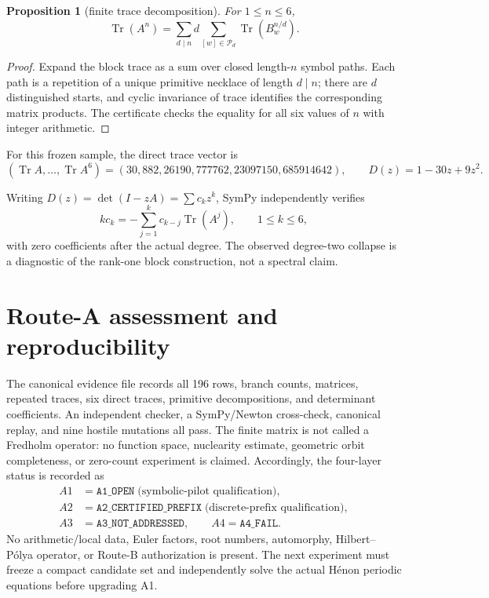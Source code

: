 \documentclass[10pt]{article}
\newtheorem{proposition}{Proposition}
\begin{document}
\begin{proposition}[finite trace decomposition]
For $1\le n\le6$,
\[
 \operatorname{Tr}(A^n)=\sum_{d\mid n}d
 \sum_{[w]\in\mathcal P_d}\operatorname{Tr}(B_w^{n/d}).
\]
\end{proposition}
\begin{proof}
Expand the block trace as a sum over closed length-$n$ symbol paths.  Each
path is a repetition of a unique primitive necklace of length $d\mid n$;
there are $d$ distinguished starts, and cyclic invariance of trace identifies
the corresponding matrix products.  The certificate checks the equality for
all six values of $n$ with integer arithmetic.
\end{proof}

For this frozen sample, the direct trace vector is
\[
(\operatorname{Tr}A,\ldots,\operatorname{Tr}A^6)=
(30,882,26190,777762,23097150,685914642),
\qquad D(z)=1-30z+9z^2.
\]

Writing $D(z)=\det(I-zA)=\sum c_kz^k$, SymPy independently verifies
\[
 k c_k=-\sum_{j=1}^k c_{k-j}\operatorname{Tr}(A^j),\qquad 1\le k\le6,
\]
with zero coefficients after the actual degree.  The observed degree-two
collapse is a diagnostic of the rank-one block construction, not a spectral
claim.

\section{Route-A assessment and reproducibility}
The canonical evidence file records all 196 rows, branch counts, matrices,
repeated traces, six direct traces, primitive decompositions, and determinant
coefficients.  An independent checker, a SymPy/Newton cross-check, canonical
replay, and nine hostile mutations all pass.  The finite matrix is not called
a Fredholm operator: no function space, nuclearity estimate, geometric orbit
completeness, or zero-count experiment is claimed. Accordingly, the four-layer
status is recorded as
\[
\begin{aligned}
A1&=\texttt{A1\_OPEN}\;\text{(symbolic-pilot qualification)},\\
A2&=\texttt{A2\_CERTIFIED\_PREFIX}\;\text{(discrete-prefix qualification)},\\
A3&=\texttt{A3\_NOT\_ADDRESSED},\qquad A4=\texttt{A4\_FAIL}.
\end{aligned}
\]
No arithmetic/local data, Euler factors, root numbers, automorphy,
Hilbert--P\'olya operator, or Route-B authorization is present.  The next
experiment must freeze a compact candidate set and independently solve the
actual H\'enon periodic equations before upgrading A1.
\end{document}
